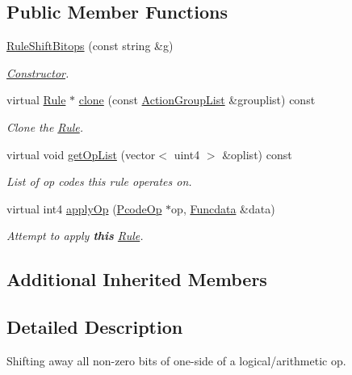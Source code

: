 \subsection*{Public Member Functions}
\begin{DoxyCompactItemize}
\item 
\mbox{\hyperlink{class_rule_shift_bitops_a559ffb30cb703a9f691c6230087eaa19}{Rule\+Shift\+Bitops}} (const string \&g)
\begin{DoxyCompactList}\small\item\em \mbox{\hyperlink{class_constructor}{Constructor}}. \end{DoxyCompactList}\item 
virtual \mbox{\hyperlink{class_rule}{Rule}} $\ast$ \mbox{\hyperlink{class_rule_shift_bitops_a3761b74c43ffef291151dc947761e17b}{clone}} (const \mbox{\hyperlink{class_action_group_list}{Action\+Group\+List}} \&grouplist) const
\begin{DoxyCompactList}\small\item\em Clone the \mbox{\hyperlink{class_rule}{Rule}}. \end{DoxyCompactList}\item 
virtual void \mbox{\hyperlink{class_rule_shift_bitops_ab97d4dba3828ab45c0d979c971b47b12}{get\+Op\+List}} (vector$<$ uint4 $>$ \&oplist) const
\begin{DoxyCompactList}\small\item\em List of op codes this rule operates on. \end{DoxyCompactList}\item 
virtual int4 \mbox{\hyperlink{class_rule_shift_bitops_acdfd1b4d0a22a3e8f15d632e810d5737}{apply\+Op}} (\mbox{\hyperlink{class_pcode_op}{Pcode\+Op}} $\ast$op, \mbox{\hyperlink{class_funcdata}{Funcdata}} \&data)
\begin{DoxyCompactList}\small\item\em Attempt to apply {\bfseries{this}} \mbox{\hyperlink{class_rule}{Rule}}. \end{DoxyCompactList}\end{DoxyCompactItemize}
\subsection*{Additional Inherited Members}


\subsection{Detailed Description}
Shifting away all non-\/zero bits of one-\/side of a logical/arithmetic op. 

